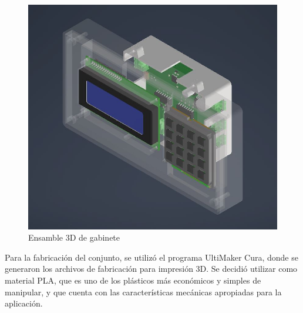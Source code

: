 \begin{figure}[htbp]
	\centering
	\includegraphics[scale=.6]{./Figures/asm_3d.JPG}
	\caption{Ensamble 3D de gabinete}
	\label{fig:ensamble}
\end{figure}

Para la fabricación del conjunto, se utilizó el programa UltiMaker Cura\citep{web_cura3d}, donde se generaron los archivos de fabricación para impresión 3D. Se decidió utilizar como material PLA, que es uno de los plásticos más económicos y simples de manipular, y que cuenta con las características mecánicas apropiadas para la aplicación.